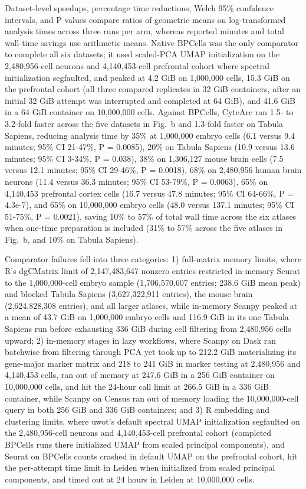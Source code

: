 Dataset-level speedups, percentage time reductions, Welch 95\% confidence intervals, and P values compare ratios of geometric means on log-transformed analysis times across three runs per arm, whereas reported minutes and total wall-time savings use arithmetic means. Native BPCells was the only comparator to complete all six datasets; it used scaled-PCA UMAP initialization on the 2,480,956-cell neurons and 4,140,453-cell prefrontal cohort where spectral initialization segfaulted, and peaked at 4.2 GiB on 1,000,000 cells, 15.3 GiB on the prefrontal cohort (all three compared replicates in 32 GiB containers, after an initial 32 GiB attempt was interrupted and completed at 64 GiB), and 41.6 GiB in a 64 GiB container on 10,000,000 cells. Against BPCells, CyteArc ran 1.5- to 3.2-fold faster across the five datasets in Fig.~b and 1.3-fold faster on Tabula Sapiens, reducing analysis time by 35\% at 1,000,000 embryo cells (6.1 versus 9.4 minutes; 95\% CI 21-47\%, P = 0.0085), 20\% on Tabula Sapiens (10.9 versus 13.6 minutes; 95\% CI 3-34\%, P = 0.038), 38\% on 1,306,127 mouse brain cells (7.5 versus 12.1 minutes; 95\% CI 29-46\%, P = 0.0018), 68\% on 2,480,956 human brain neurons (11.4 versus 36.3 minutes; 95\% CI 53-79\%, P = 0.0063), 65\% on 4,140,453 prefrontal cortex cells (16.7 versus 47.8 minutes; 95\% CI 64-66\%, P = 4.3e-7), and 65\% on 10,000,000 embryo cells (48.0 versus 137.1 minutes; 95\% CI 51-75\%, P = 0.0021), saving 10\% to 57\% of total wall time across the six atlases when one-time preparation is included (31\% to 57\% across the five atlases in Fig.~b, and 10\% on Tabula Sapiens).

Comparator failures fell into three categories: 1) full-matrix memory limits, where R's dgCMatrix limit of 2,147,483,647 nonzero entries restricted in-memory Seurat to the 1,000,000-cell embryo sample (1,706,570,607 entries; 238.6 GiB mean peak) and blocked Tabula Sapiens (3,627,322,911 entries), the mouse brain (2,624,828,308 entries), and all larger atlases, while in-memory Scanpy peaked at a mean of 43.7 GiB on 1,000,000 embryo cells and 116.9 GiB in its one Tabula Sapiens run before exhausting 336 GiB during cell filtering from 2,480,956 cells upward; 2) in-memory stages in lazy workflows, where Scanpy on Dask ran batchwise from filtering through PCA yet took up to 212.2 GiB materializing its gene-major marker matrix and 218 to 241 GiB in marker testing at 2,480,956 and 4,140,453 cells, ran out of memory at 247.6 GiB in a 256 GiB container on 10,000,000 cells, and hit the 24-hour call limit at 266.5 GiB in a 336 GiB container, while Scanpy on Census ran out of memory loading the 10,000,000-cell query in both 256 GiB and 336 GiB containers; and 3) R embedding and clustering limits, where uwot's default spectral UMAP initialization segfaulted on the 2,480,956-cell neurons and 4,140,453-cell prefrontal cohort (completed BPCells runs there initialized UMAP from scaled principal components), and Seurat on BPCells counts crashed in default UMAP on the prefrontal cohort, hit the per-attempt time limit in Leiden when initialized from scaled principal components, and timed out at 24 hours in Leiden at 10,000,000 cells.

